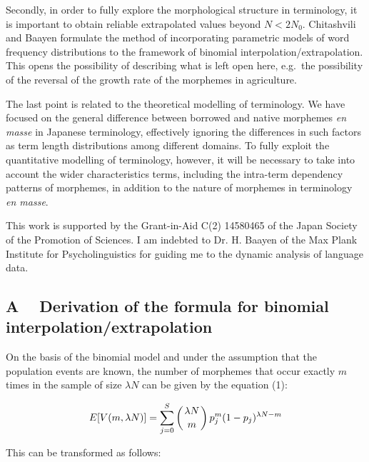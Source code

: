 Secondly, in order to fully explore the morphological structure in terminology,
it is important to obtain reliable extrapolated values beyond $N < 2N_0$.
Chitashvili and Baayen \cite{chita93,baayen01} formulate the method
of incorporating parametric models of word frequency distributions
\cite{zipf35,yule44,simon55,carrol67,sichel75} to the framework of
binomial interpolation/extrapolation. This opens the possibility of
describing what is left open here, e.g.\ the possibility of the
reversal of the growth rate of the morphemes in agriculture.

The last point is related to the theoretical modelling of terminology.
We have focused on the general difference between borrowed and native
morphemes {\it en masse} in Japanese terminology, effectively ignoring
the differences in such factors as term length distributions among different
domains. To fully exploit the quantitative modelling of terminology, 
however, it will be necessary to take into account the wider characteristics
terms, including the intra-term dependency patterns of morphemes, in addition
to the nature of morphemes in terminology {\it en masse}.


\acknowledgment

This work is supported by the Grant-in-Aid C(2) 14580465 of the Japan
Society of the Promotion of Sciences. I am indebted to Dr. H. Baayen
of the Max Plank Institute for Psycholinguistics for guiding me to the
dynamic analysis of language data. 






\appendix
\subsection*{A 　Derivation of the formula for binomial 
\\ interpolation/extrapolation
}


On the basis of the binomial model and under the assumption that
the population events are known, the number of morphemes that occur
exactly $m$ times in the sample of size $\lambda N$ can be given by
the equation (1):

\begin{displaymath}
E[V(m,\lambda N)]  = \sum_{j=0}^S \left ({\lambda N \atop m} \right )
    p_j^m (1-p_j)^{\lambda N -m}
\end{displaymath}

This can be transformed as follows:

\vspace*{-\baselineskip}
 
